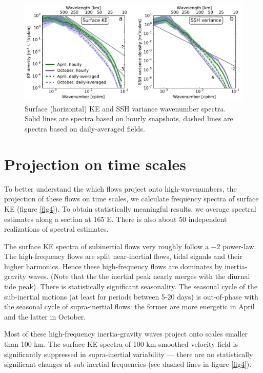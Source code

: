 \documentclass[grl]{agutex2015}
\begin{document}
\begin{article}
\begin{figure}[ht]
  \begin{center}
    \includegraphics[width=.9\textwidth]{figs/fig3.pdf}
 \caption{Surface (horizontal) KE and SSH variance wavenumber spectra. Solid lines
 are spectra based on hourly snapshots, dashed lines are spectra based on daily-averaged
 fields.}
 \label{fig3}
 \end{center}
\end{figure}

\section{Projection on time scales}
To better understand the which flows project onto high-wavenumbers, the projection
of these flows on time scales, we calculate frequency spectra of surface KE
(figure \ref{fig4}). To obtain statistically meaningful results, we average
spectral estimates along a section at 165$^\circ$E.  There is also about 50
independent realizations of spectral estimates.

The surface KE spectra of subinertial flows very roughly follow a $-2$ power-law.
The high-frequency flows are split near-inertial flows, tidal signals and their
higher harmonics. Hence these high-frequency flows are dominates by inertia-gravity
waves. (Note that the the inertial peak nearly merges with the
diurnal tide peak). There is statistically significant seasonality. The seasonal
cycle of the sub-inertial motions (at least for periods between 5-20 days)
is out-of-phase with the seasonal cycle of supra-inertial flows: the former
are more energetic in April and the latter in October.

Most of these high-frequency inertia-gravity waves project onto scales smaller
than 100 km. The surface KE spectra of 100-km-smoothed velocity field is significantly
suppressed in supra-inertial variability --- there are no statistically significant
changes at sub-inertial frequencies (see dashed lines in figure \ref{fig4}).


\end{article}
\end{document}
